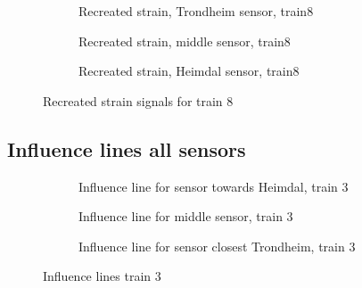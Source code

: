 \begin{figure}[h]
  \begin{subfigure}[t]{0.9\textwidth}
    \centering
    
    \caption{Recreated strain, Trondheim sensor, train8} %
    \label{recreated_sensor_trond_train8}
  \end{subfigure}
%
  \begin{subfigure}[t]{0.9\textwidth}
    \centering
    
    \caption{Recreated strain, middle sensor, train8} %
    \label{recreated_sensor_middle_train8}
  \end{subfigure}
%
  \begin{subfigure}[t]{0.9\textwidth}
    \centering
    
    \caption{Recreated strain, Heimdal sensor, train8} %
    \label{recreated_sensor_heimdal_train8}
  \end{subfigure}
%
  \caption{Recreated strain signals for train 8}
  \label{fig:recreated_strains_train8}
\end{figure}%

\subsection{Influence lines all sensors}%

\begin{figure}[h]
  \begin{subfigure}[t]{0.9\textwidth}
    \centering
    
    \caption{Influence line for sensor towards Heimdal, train 3}
    \label{infl_Heimdal_train3}
  \end{subfigure}
  \begin{subfigure}[t]{0.9\textwidth}
    \centering
    
    \caption{Influence line for middle sensor, train 3}
    \label{infl_middle_train3}
  \end{subfigure}
  \begin{subfigure}[t]{0.9\textwidth}
    \centering
    
    \caption{Influence line for sensor closest Trondheim, train 3}
    \label{infl_Trondheim_train3}
  \end{subfigure}
  \caption{Influence lines train 3}
  \label{influence_lines_train3}
\end{figure}


